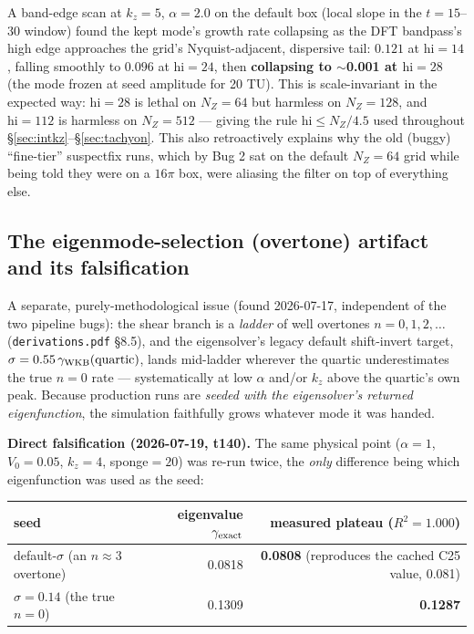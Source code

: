 \documentclass[11pt,a4paper]{article}
\numberwithin{equation}{section}
\theoremstyle{remark}
\newcommand{\Vo}{V_0}
\newcommand{\kz}{k_z}
\begin{document}
A band-edge scan at $\kz=5$, $\alpha=2.0$ on the default box (local slope
in the $t=15$--$30$ window) found the kept mode's growth rate collapsing
as the DFT bandpass's high edge approaches the grid's Nyquist-adjacent,
dispersive tail: $0.121$ at $\text{hi}=14$, falling smoothly to $0.096$ at
$\text{hi}=24$, then \textbf{collapsing to $\sim$0.001 at
$\text{hi}=28$} (the mode frozen at seed amplitude for 20 TU). This is
scale-invariant in the expected way: $\text{hi}=28$ is lethal on
$N_Z=64$ but harmless on $N_Z=128$, and $\text{hi}=112$ is harmless on
$N_Z=512$ — giving the rule $\text{hi}\le N_Z/4.5$ used throughout
\S\ref{sec:intkz}--\S\ref{sec:tachyon}. This also retroactively explains
why the old (buggy) ``fine-tier'' suspectfix runs, which by Bug 2 sat on
the default $N_Z=64$ grid while being told they were on a $16\pi$ box,
were aliasing the filter on top of everything else.

\subsection{The eigenmode-selection (overtone) artifact and its
falsification}
\label{ssec:overtone}

A separate, purely-methodological issue (found 2026-07-17, independent of
the two pipeline bugs): the shear branch is a \emph{ladder} of well
overtones $n=0,1,2,\dots$ (\texttt{derivations.pdf} \S8.5), and the
eigensolver's legacy default shift-invert target,
$\sigma=0.55\,\gamma_{\rm WKB}(\text{quartic})$, lands mid-ladder wherever
the quartic underestimates the true $n{=}0$ rate --- systematically at
low $\alpha$ and/or $\kz$ above the quartic's own peak. Because
production runs are \emph{seeded with the eigensolver's returned
eigenfunction}, the simulation faithfully grows whatever mode it was
handed.

\textbf{Direct falsification (2026-07-19, t140).} The same physical point
($\alpha=1$, $\Vo=0.05$, $\kz=4$, sponge$=20$) was re-run twice, the
\emph{only} difference being which eigenfunction was used as the seed:

\begin{center}
\begin{tabular}{lrr}
\toprule
seed & eigenvalue $\gamma_{\rm exact}$ & measured plateau ($R^2=1.000$)\\
\midrule
default-$\sigma$ (an $n\approx3$ overtone) & 0.0818 & \textbf{0.0808} (reproduces the cached C25 value, 0.081)\\
$\sigma=0.14$ (the true $n=0$) & 0.1309 & \textbf{0.1287}\\
\bottomrule
\end{tabular}
\end{center}
\end{document}
